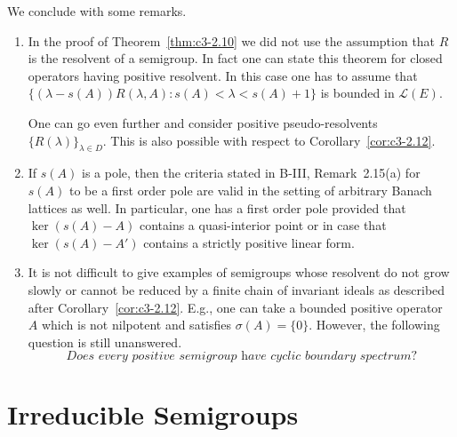 We conclude with some remarks.
\begin{remarks}\label{rem:c3-2.15}
\begin{enumerate}[\upshape (i), wide, labelindent=.5em]	
	\item 
	In the proof of Theorem~\ref{thm:c3-2.10} we did not use the assumption that $R$ is the resolvent of a semigroup.
	In fact one can state this theorem for closed operators having positive resolvent.
	In this case one has to assume that $\{(\lambda-s(A))R(\lambda,A) \colon s(A) < \lambda < s(A)+1\}$ is bounded in $\mathcal{L}(E)$.
	
	One can go even further and consider positive pseudo-resolvents $\{R(\lambda)\}_{\lambda\in D}$.
	This is also possible with respect to Corollary~\ref{cor:c3-2.12}.
	
	\item 
	If $s(A)$ is a pole, then the criteria stated in B-III, Remark~2.15(a) for $s(A)$ to be a first order pole are valid in the setting of arbitrary Banach lattices as well.
	In particular, one has a first order pole provided that $\ker(s(A) - A)$ contains a quasi-interior point or in case that $\ker(s(A) - A')$ contains a strictly positive linear form.
	
	\item 
	It is not difficult to give examples of semigroups whose resolvent do not grow slowly or cannot be reduced by a finite chain of invariant ideals as described after Corollary~\ref{cor:c3-2.12}.
	E.g., one can take a bounded positive operator $A$ which is not nilpotent and satisfies $\sigma(A) = \{0\}$.
	However, the following question is still unanswered.
	\begin{equation*}
		\textit{Does every positive semigroup have cyclic boundary spectrum?}
	\end{equation*}
\end{enumerate}
\end{remarks}

\section{Irreducible Semigroups}\label{sec:c3-3}

